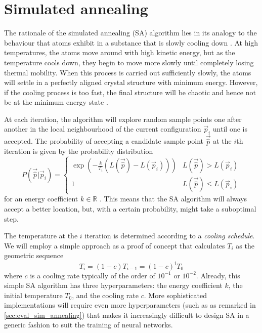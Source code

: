 \section{Simulated annealing}
The rationale of the simulated annealing (SA) algorithm lies in its analogy to the behaviour that atoms exhibit in a substance that is slowly cooling down \cite{kirkpatrick1983}.
At high temperatures, the atoms move around with high kinetic energy, but as the temperature cools down, they begin to move more slowly until completely losing thermal mobility. 
When this process is carried out sufficiently slowly, the atoms will settle in a perfectly aligned crystal structure with minimum energy. 
However, if the cooling process is too fast, the final structure will be chaotic and hence not be at the minimum energy state \cite[p. 444]{press1992}.

At each iteration, the algorithm will explore random sample points one after another in the local neighbourhood of the current configuration $\vec{p}_i$ until one is accepted. 
The probability of accepting a candidate sample point $\vec{\hat{p}}$ at the $i$th iteration is given by the probability distribution
\begin{equation}
    P(\vec{\hat{p}}|\vec{p}_i) = \begin{cases}
        \exp{\left(-\frac{k}{T_i} \left(L(\vec{\hat{p}}) - L(\vec{p}_i)\right) \right)} & L(\vec{\hat{p}}) > L(\vec{p}_i) \\
        1 & L(\vec{\hat{p}}) \leq L(\vec{p}_i)
    \end{cases}
\end{equation}
for an energy coefficient $k\in \mathbb{R}$ \cite{rios2009}.
This means that the SA algorithm will always accept a better location, but, with a certain probability, might take a suboptimal step.

The temperature at the $i$ iteration is determined according to a \textit{cooling schedule}. 
We will employ a simple approach as a proof of concept that calculates $T_i$ as the geometric sequence
\begin{equation}
    T_i = \left(1 - c\right) T_{i-1} = \left(1 - c\right)^i T_0
\end{equation}
where $c$ is a cooling rate typically of the order of $10^{-1}$ or $10^{-2}$.
Already, this simple SA algorithm has three hyperparameters: the energy coefficient $k$, the initial temperature $T_0$, and the cooling rate $c$. 
More sophisticated implementations will require even more hyperparameters (such as \textcite{press1992} as remarked in \ref{sec:eval_sim_annealing}) that makes it increasingly difficult to design SA in a generic fashion to suit the training of neural networks. 

